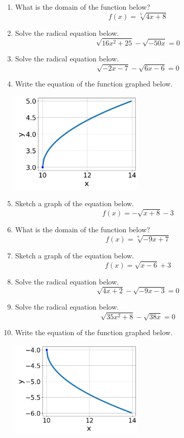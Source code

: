 \documentclass[14pt]{extbook}
\begin{document}
\begin{enumerate}
\item{
What is the domain of the function below?\[ f(x) = \sqrt[5]{4 x + 8} \]} \newpage
\item{
Solve the radical equation below.\[ \sqrt{16 x^2 + 25} - \sqrt{-50 x} = 0 \]} \newpage
\item{
Solve the radical equation below.\[ \sqrt{-2 x - 7} - \sqrt{6 x - 6} = 0 \]} \newpage
\item{
Write the equation of the function graphed below.
\begin{center}
    \includegraphics[width=0.5\textwidth]{../Figures/radicalGraphToEquationA.png}
\end{center}
} \newpage
\item{
Sketch a graph of the equation below.\[ f(x) = - \sqrt{x + 8} - 3 \]} \newpage
\item{
What is the domain of the function below?\[ f(x) = \sqrt[8]{-9 x + 7} \]} \newpage
\item{
Sketch a graph of the equation below.\[ f(x) = \sqrt{x - 6} + 3 \]} \newpage
\item{
Solve the radical equation below.\[ \sqrt{4 x + 2} - \sqrt{-9 x - 3} = 0 \]} \newpage
\item{
Solve the radical equation below.\[ \sqrt{35 x^2 + 8} - \sqrt{38 x} = 0 \]} \newpage
\item{
Write the equation of the function graphed below.
\begin{center}
    \includegraphics[width=0.5\textwidth]{../Figures/radicalGraphToEquationCopyA.png}
\end{center}
} \newpage
\end{enumerate}
\end{document}

